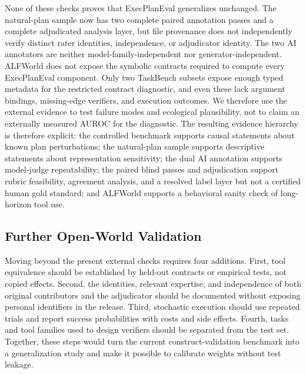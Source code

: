 \documentclass[10pt]{article}
\begin{document}
None of these checks proves that ExecPlanEval generalizes unchanged. The
natural-plan sample now has two complete paired annotation passes and a
complete adjudicated analysis layer, but file provenance does not independently
verify distinct rater identities, independence, or adjudicator identity. The two AI
annotators are neither model-family-independent nor generator-independent.
ALFWorld does not
expose the symbolic contracts required to compute every ExecPlanEval component.
Only two TaskBench subsets expose enough typed metadata for the restricted
contract diagnostic, and even these lack argument bindings, missing-edge
verifiers, and execution outcomes. We therefore use the external evidence to test failure modes and ecological
plausibility, not to claim an externally measured AUROC for the diagnostic.
The resulting evidence hierarchy is therefore explicit: the controlled
benchmark supports causal statements about known plan perturbations; the
natural-plan sample supports descriptive statements about representation
sensitivity; the dual AI annotation supports model-judge repeatability; the
paired blind passes and adjudication support rubric feasibility, agreement
analysis, and a resolved label layer but not a certified human gold standard;
and ALFWorld supports a behavioral sanity
check of long-horizon tool use.

\subsection{Further Open-World Validation}
Moving beyond the present external checks requires four additions. First,
tool equivalence should
be established by held-out contracts or empirical tests, not copied effects.
Second, the identities, relevant expertise, and independence of both original
contributors and the adjudicator should be documented without exposing personal
identifiers in the release. Third, stochastic execution should use repeated
trials and report success probabilities with costs and side effects. Fourth,
tasks and tool families used to design verifiers should be separated from the
test set. Together, these steps would turn the current construct-validation
benchmark into a generalization study and make it possible to calibrate weights
without test leakage.
\end{document}
